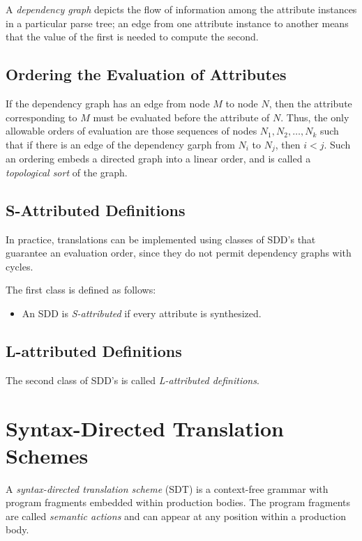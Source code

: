 \documentclass[12pt,a4paper,twoside,openany]{book}
\begin{document}
A \textit{dependency graph} depicts the flow of information among the attribute instances in a particular parse tree; an edge from one attribute instance to another means that the value of the first is needed to compute the second.

\subsection{Ordering the Evaluation of Attributes}

If the dependency graph has an edge from node $M$ to node $N$, then the attribute corresponding to $M$ must be evaluated before the attribute of $N$. Thus, the only allowable orders of evaluation are those sequences of nodes $N_1,N_2,\ldots,N_k$ such that if there is an edge of the dependency garph from $N_i$ to $N_j$, then $i<j$. Such an ordering embeds a directed graph into a linear order, and is called a \textit{topological sort} of the graph.

\subsection{S-Attributed Definitions}

In practice, translations can be implemented using classes of SDD's that guarantee an evaluation order, since they do not permit dependency graphs with cycles.

The first class is defined as follows:
\begin{itemize}
    \item An SDD is \textit{S-attributed} if every attribute is synthesized.
\end{itemize}

\subsection{L-attributed Definitions}

The second class of SDD's is called \textit{L-attributed definitions}.

\section{Syntax-Directed Translation Schemes}

A \textit{syntax-directed translation scheme} (SDT) is a context-free grammar with program fragments embedded within production bodies. The program fragments are called \textit{semantic actions} and can appear at any position within a production body.
\end{document}
